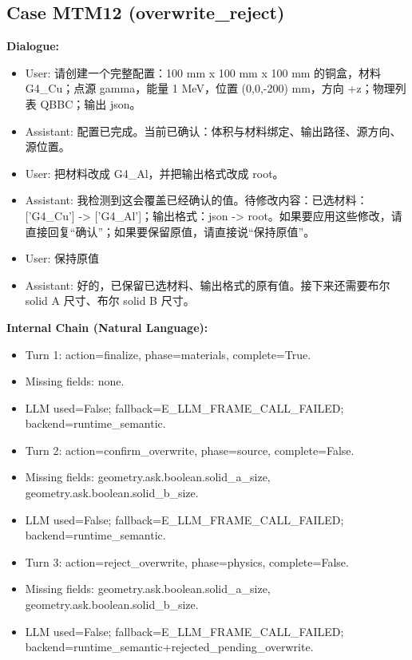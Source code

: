 \documentclass[11pt]{ctexart}
\begin{document}
\subsection{Case MTM12 (overwrite\_reject)}
\textbf{Dialogue:}
\begin{itemize}
\item User: 请创建一个完整配置：100 mm x 100 mm x 100 mm 的铜盒，材料 G4\_Cu；点源 gamma，能量 1 MeV，位置 (0,0,-200) mm，方向 +z；物理列表 QBBC；输出 json。
\item Assistant: 配置已完成。当前已确认：体积与材料绑定、输出路径、源方向、源位置。
\item User: 把材料改成 G4\_Al，并把输出格式改成 root。
\item Assistant: 我检测到这会覆盖已经确认的值。待修改内容：已选材料：['G4\_Cu'] -> ['G4\_Al']；输出格式：json -> root。如果要应用这些修改，请直接回复“确认”；如果要保留原值，请直接说“保持原值”。
\item User: 保持原值
\item Assistant: 好的，已保留已选材料、输出格式的原有值。接下来还需要布尔 solid A 尺寸、布尔 solid B 尺寸。
\end{itemize}
\textbf{Internal Chain (Natural Language):}
\begin{itemize}
\item Turn 1: action=finalize, phase=materials, complete=True.
\item Missing fields: none.
\item LLM used=False; fallback=E\_LLM\_FRAME\_CALL\_FAILED; backend=runtime\_semantic.
\item Turn 2: action=confirm\_overwrite, phase=source, complete=False.
\item Missing fields: geometry.ask.boolean.solid\_a\_size, geometry.ask.boolean.solid\_b\_size.
\item LLM used=False; fallback=E\_LLM\_FRAME\_CALL\_FAILED; backend=runtime\_semantic.
\item Turn 3: action=reject\_overwrite, phase=physics, complete=False.
\item Missing fields: geometry.ask.boolean.solid\_a\_size, geometry.ask.boolean.solid\_b\_size.
\item LLM used=False; fallback=E\_LLM\_FRAME\_CALL\_FAILED; backend=runtime\_semantic+rejected\_pending\_overwrite.
\end{itemize}
\end{document}
